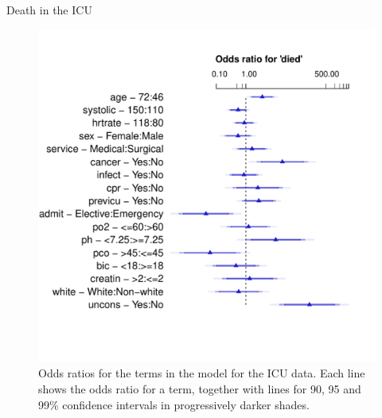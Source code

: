 \documentclass[11pt]{book}
\renewenvironment{knitrout}{\small\renewcommand{\baselinestretch}{.85}}{} %
\begin{document}
\begin{Example}[icu1]{Death in the ICU}
\begin{knitrout}
\color{fgcolor}\begin{kframe}
\begin{alltt}
 \hlkwb{<-} 
 \hlstd{=}\hlstd{,} \hlstd{=}\hlstd{,} \hlstd{=}\hlstd{,}
      \hlstd{=} \hlstd{(}\hlstd{,} \hlstd{,} \hlstd{,}  \hlstd{=} \hlstd{(}\hlstd{,} \hlstd{,} \hlstd{)))}
\end{alltt}
\end{kframe}
\end{knitrout}


\begin{figure}[!htb]
 \centering
 \includegraphics[width=.7\textwidth]{ch07/fig/icu-odds-ratios-cropped}
 \caption{Odds ratios for the terms in the model for the ICU data. Each line shows the odds ratio for a term, together with lines for 90, 95 and 99\% confidence intervals in progressively darker shades.}
 \label{fig:icu1-odds-ratios}
\end{figure}


\end{Example}
\end{document}
